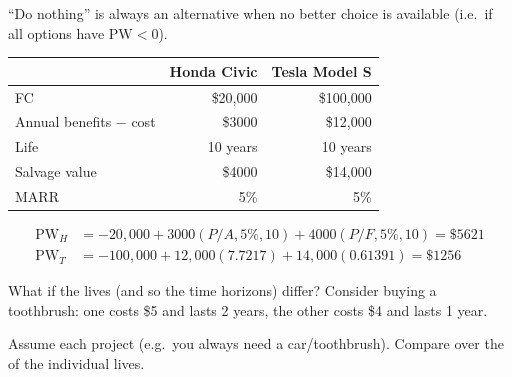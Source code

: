 \begin{remark}
    ``Do nothing'' is always an alternative when no better choice is
    available (i.e.\ if all options have $\text{PW} < 0$).
\end{remark}

\begin{example}
    \begin{center}
    \begin{tabular}{lrr}
        \toprule
        & Honda Civic & Tesla Model S \\
        \midrule
        FC & \$20,000 & \$100,000 \\
        Annual benefits $-$ cost & \$3000 & \$12,000 \\
        Life & 10 years & 10 years \\
        Salvage value & \$4000 & \$14,000 \\
        MARR & 5\% & 5\% \\
        \bottomrule
    \end{tabular}
    \end{center}
    \begin{align*}
        \text{PW}_H &= -20{,}000 + 3000(P/A,5\%,10) + 4000(P/F,5\%,10) = \$5621\\
        \text{PW}_T &= -100{,}000 + 12{,}000(7.7217) + 14{,}000(0.61391) = \$1256
    \end{align*}
\end{example}

What if the lives (and so the time horizons) differ? Consider buying a
toothbrush: one costs \$5 and lasts 2 years, the other costs \$4 and lasts
1 year.
\\

\begin{definition}
    Assume each project  (e.g.\ you always need a
    car/toothbrush). Compare over the  of
    the individual lives.
\end{definition}

